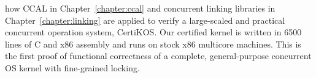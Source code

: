 
how CCAL in Chapter~\ref{chapter:ccal} and concurrent linking libraries in Chapter~\ref{chapter:linking} are applied 
to verify a large-scaled and practical concurrent operation system, CertiKOS.
Our certified kernel is written in 6500 lines of C and x86 assembly
and runs on stock x86 multicore machines. This is
the first proof of functional correctness of a complete,
general-purpose concurrent OS kernel with fine-grained locking.